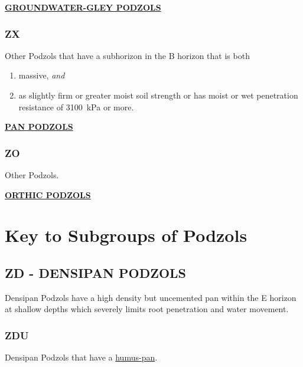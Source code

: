 \documentclass[
  letterpaper,
  DIV=11,
  numbers=noendperiod]{scrreprt}
\providecommand{\tightlist}{%
  \setlength{\itemsep}{0pt}\setlength{\parskip}{0pt}}\usepackage{longtable,booktabs,array}
\begin{document}
\protect\hyperlink{sec-ZG}{\textbf{GROUNDWATER-GLEY PODZOLS}}

\hypertarget{sec-key-ZX}{%
\subsubsection{\texorpdfstring{\textbf{ZX}}{ZX}}\label{sec-key-ZX}}

Other Podzols that have a subhorizon in the B horizon that is both

\begin{enumerate}
\def\labelenumi{\arabic{enumi}.}
\tightlist
\item
  massive, \emph{and}
\item
  as slightly firm or greater moist soil strength or has moist or wet
  penetration resistance of 3100~kPa or more.
\end{enumerate}

\protect\hyperlink{sec-ZX}{\textbf{PAN PODZOLS}}

\hypertarget{sec-key-ZO}{%
\subsubsection{\texorpdfstring{\textbf{ZO}}{ZO}}\label{sec-key-ZO}}

Other Podzols.

\protect\hyperlink{sec-ZO}{\textbf{ORTHIC PODZOLS}}

\hypertarget{sec-sub-Z}{%
\section{Key to Subgroups of Podzols}\label{sec-sub-Z}}

\hypertarget{sec-ZD}{%
\subsection{\texorpdfstring{\textbf{ZD} - DENSIPAN
PODZOLS}{ZD - DENSIPAN PODZOLS}}\label{sec-ZD}}

Densipan Podzols have a high density but uncemented pan within the E
horizon at shallow depths which severely limits root penetration and
water movement.

\hypertarget{sec-key-ZDU}{%
\subsubsection{\texorpdfstring{\textbf{ZDU}}{ZDU}}\label{sec-key-ZDU}}

Densipan Podzols that have a
\protect\hyperlink{sec-diag-hpan}{humus-pan}.
\end{document}
